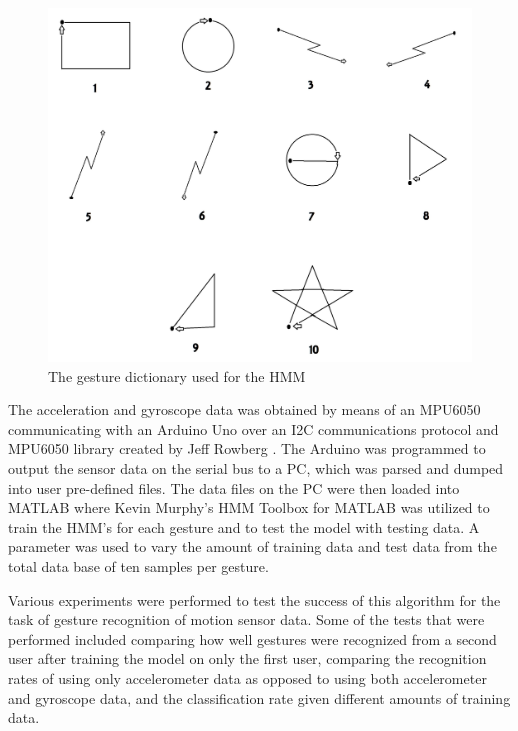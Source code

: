 \documentclass[conference]{IEEEtran}
\begin{document}
\begin{figure}[h]
\begin{center}
\noindent
  \includegraphics[width=\columnwidth]{Gestures}
  \caption{The gesture dictionary used for the HMM} \label{fig:Gestures}
\end{center}
\end{figure}

The acceleration and gyroscope data was obtained by means of an MPU6050 communicating with an Arduino Uno over an I2C communications protocol and MPU6050 library created by Jeff Rowberg \cite{Rowberg}. The Arduino was programmed to output the sensor data on the serial bus to a PC, which was parsed and dumped into user pre-defined files. The data files on the PC were then loaded into MATLAB where Kevin Murphy's HMM Toolbox for MATLAB \cite{Murphy} was utilized to train the HMM's for each gesture and to test the model with testing data. A parameter was used to vary the amount of training data and test data from the total data base of ten samples per gesture. 

Various experiments were performed to test the success of this algorithm for the task of gesture recognition of motion sensor data. Some of the tests that were performed included comparing how well gestures were recognized from a second user after training the model on only the first user, comparing the recognition rates of using only accelerometer data as opposed to using both accelerometer and gyroscope data, and the classification rate given different amounts of training data.
\end{document}
